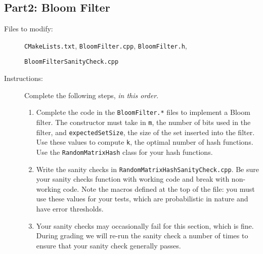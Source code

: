 \documentclass[paper=a4, fontsize=11pt]{scrartcl} %
\numberwithin{equation}{section} %
\numberwithin{figure}{section} %
\numberwithin{table}{section} %
\begin{document}
\subsection*{Part2: Bloom Filter}
\begin{description}
	\item[Files to modify:] \texttt{CMakeLists.txt}, \texttt{BloomFilter.cpp}, \texttt{BloomFilter.h}, 
	
	\texttt{BloomFilterSanityCheck.cpp}
	\item[Instructions:] Complete the following steps, \textit{in this order}.
		\begin{enumerate}
			\item Complete the code in the \texttt{BloomFilter.*} files to implement a Bloom filter. The constructor must take in \texttt{m}, the number of bits used in the filter, and \texttt{expectedSetSize}, the size of the set inserted into the filter. Use these values to compute \texttt{k}, the optimal number of hash functions. Use the \texttt{RandomMatrixHash} class for your hash functions. 
			\item Write the sanity checks in \texttt{RandomMatrixHashSanityCheck.cpp}. Be sure your sanity checks function with working code and break with non-working code. Note the macros defined at the top of the file: you must use these values for your tests, which are probabilistic in nature and have error thresholds.
			\item Your sanity checks may occasionally fail for this section, which is fine. During grading we will re-run the sanity check a number of times to ensure that your sanity check generally passes.
		\end{enumerate}
\end{description}
\end{document}
